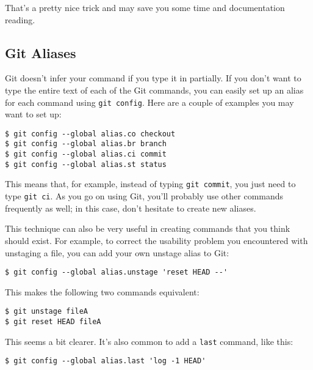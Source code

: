 \documentclass[a4paper]{book}
\begin{document}
That's a pretty nice trick and may save you some time and documentation reading.

\subsection{Git Aliases}

Git doesn't infer your command if you type it in partially. If you don't want to type the entire text of each of the Git commands, you can easily set up an alias for each command using \texttt{git config}. Here are a couple of examples you may want to set up:

\begin{shaded}\begin{verbatim}
$ git config --global alias.co checkout
$ git config --global alias.br branch
$ git config --global alias.ci commit
$ git config --global alias.st status
\end{verbatim}\end{shaded}

This means that, for example, instead of typing \texttt{git commit}, you just need to type \texttt{git ci}. As you go on using Git, you'll probably use other commands frequently as well; in this case, don't hesitate to create new aliases.

This technique can also be very useful in creating commands that you think should exist. For example, to correct the usability problem you encountered with unstaging a file, you can add your own unstage alias to Git:

\begin{shaded}\begin{verbatim}
$ git config --global alias.unstage 'reset HEAD --'
\end{verbatim}\end{shaded}

This makes the following two commands equivalent:

\begin{shaded}\begin{verbatim}
$ git unstage fileA
$ git reset HEAD fileA
\end{verbatim}\end{shaded}

This seems a bit clearer. It's also common to add a \texttt{last} command, like this:

\begin{shaded}\begin{verbatim}
$ git config --global alias.last 'log -1 HEAD'
\end{verbatim}\end{shaded}
\end{document}
